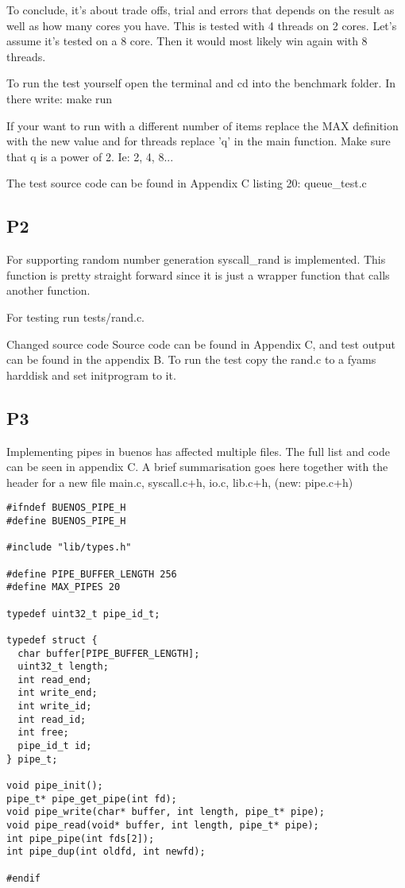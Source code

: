 \documentclass[12pt]{article}
\begin{document}
To conclude, it's about trade offs, trial and errors that depends on the result as well as how many cores you have. This is tested with 4 threads on 2 cores. Let's assume it's tested on a 8 core. Then it would most likely win again with 8 threads.

To run the test yourself open the terminal and cd into the benchmark folder. In there write: make run

If your want to run with a different number of items replace the MAX definition with the new value and for threads replace 'q' in the main function. Make sure that q is a power of 2. Ie: 2, 4, 8...

The test source code can be found in Appendix C listing 20: queue\_test.c



\subsection{P2}

For supporting random number generation syscall\_rand is implemented. This function is pretty straight forward since it is just a wrapper function that calls another function.

For testing run tests/rand.c.

Changed source code Source code can be found in Appendix C, and test output can be found in the appendix B. To run the test copy the rand.c to a fyams harddisk and set initprogram to it.


\subsection{P3}

Implementing pipes in buenos has affected multiple files. The full list and code can be seen in appendix C. A brief summarisation goes here together with the header for a new file  main.c, syscall.c+h, io.c, lib.c+h, (new: pipe.c+h)


\begin{lstlisting}[caption=pipe.h]
#ifndef BUENOS_PIPE_H
#define BUENOS_PIPE_H

#include "lib/types.h"

#define PIPE_BUFFER_LENGTH 256
#define MAX_PIPES 20

typedef uint32_t pipe_id_t;

typedef struct {
  char buffer[PIPE_BUFFER_LENGTH];
  uint32_t length;
  int read_end;
  int write_end;
  int write_id;
  int read_id;
  int free;
  pipe_id_t id;
} pipe_t;

void pipe_init();
pipe_t* pipe_get_pipe(int fd);
void pipe_write(char* buffer, int length, pipe_t* pipe);
void pipe_read(void* buffer, int length, pipe_t* pipe);
int pipe_pipe(int fds[2]);
int pipe_dup(int oldfd, int newfd);

#endif

\end{lstlisting}
\end{document}
